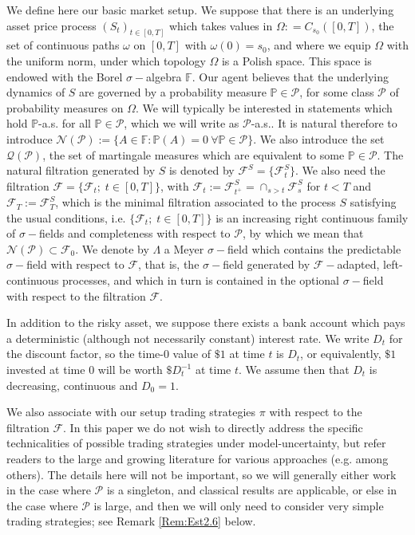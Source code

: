 \documentclass[a4paper]{amsart}
\theoremstyle{definition}
\theoremstyle{remark}
\numberwithin{equation}{section}
\renewcommand{\P}{\mathbb{P}}
\newcommand{\as}{a.s.}
\newcommand{\eg}{e.g.}
\newcommand{\F}{\mathcal{F}}
\newcommand{\Fc}{\mathcal{F}}
\newcommand{\Pc}{\mathcal{P}}
\newcommand{\Qc}{\mathcal{Q}}
\begin{document}
We define here our basic market setup. We suppose that there is an underlying asset price process $(S_{t})_{t \in [0,T]}$ which takes values in $\Omega: = C_{s_0}([0,T])$, the set of continuous paths $\omega$ on $[0,T]$ with $\omega(0) = s_0$, and where we equip $\Omega$ with the uniform norm, under which topology $\Omega$ is a Polish space. This space is endowed with the Borel $\sigma-$algebra $\mathbb{F}$. Our agent believes that the underlying dynamics of $S$ are governed by a probability measure $\P \in \mathcal{P}$, for some class $\mathcal{P}$ of probability measures on $\Omega$. We will typically be interested in statements which hold $\P$-\as{} for all $\P \in \Pc$, which we will write as $\Pc$-\as{}. It is natural therefore to introduce $\mathcal{N}(\mathcal{P}):= \{A \in \mathbb{F}: \P(A) = 0 \ \forall \P \in \Pc\}$. We also introduce the set $\Qc(\Pc)$, the set of martingale measures which are equivalent to some $\P \in \Pc$. The natural filtration generated by $S$ is denoted by $\Fc^S=\{\F_t^S\}$. We also need the filtration $\Fc=\{\F_t;\;t\in[0,T]\}$, with $\F_t:=\F^S_{t^+}=\cap_{s>t} \F_s^S$ for $t<T$ and $\F_T:=\F_T^S$, which is the minimal filtration associated to the process $S$ satisfying the usual conditions, i.e. $\{\F_t;\;t\in[0,T]\}$ is an increasing right continuous family of $\sigma-$fields and completeness with respect to $\mathcal{P}$, by which we mean that $\mathcal{N}(\Pc) \subset \F_0$.
We denote by $\Lambda$ a  Meyer $\sigma-$field which contains the predictable $\sigma-$field with respect to $\F$, that is, the  $\sigma-$field generated by $\F-$adapted, left-continuous processes, and which in turn is contained in the optional $\sigma-$field with respect to the filtration $\F$. 

In addition to the risky asset, we suppose there exists a bank account which pays a deterministic (although not necessarily constant) interest rate. We write $D_t$ for the discount factor, so the time-0 value of $\$1$ at time $t$ is $D_t$, or equivalently, $\$1$ invested at time $0$ will be worth $\$D_t^{-1}$ at time $t$. We assume then that $D_t$ is decreasing, continuous  and $D_0 = 1$.

We also associate with our setup   trading strategies $\pi$ with respect to the filtration $\F$. In this paper we do not wish to directly address the specific technicalities of possible trading strategies under model-uncertainty, but refer readers to the large and growing literature for various approaches (\eg{} \cite{Dolinsky:2014aa, beiglbock_pathwise_2017, biagini_robust_2017, hou_robust_2018, dolinsky_martingale_2015,cheridito_martingale_2021} among others). The details here will not be important, so we will generally either work in the case where $\Pc$ is a singleton, and classical results are applicable, or else in the case where $\Pc$ is large, and then we will only need to consider very simple trading strategies; see Remark \ref{Rem:Est2.6} below.
\end{document}
